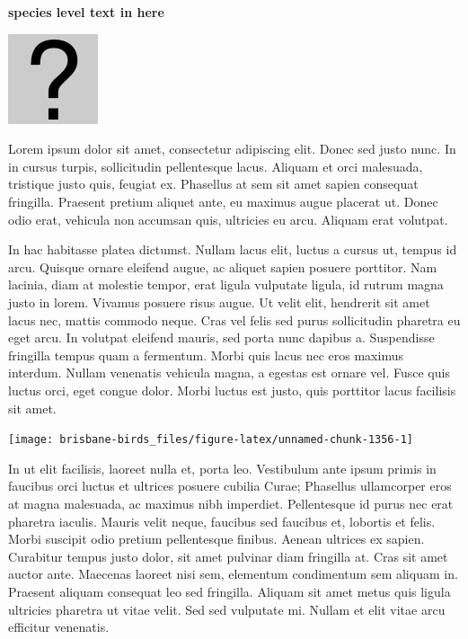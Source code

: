 \documentclass[]{book}
\let\origfigure\figure
\let\endorigfigure\endfigure
\renewenvironment{figure}[1][2] {
  \expandafter\origfigure\expandafter[H]
} {
  \endorigfigure
}
\begin{document}
\textbf{species level text in here}

\begin{figure}
\centering
\includegraphics{assets/missing.png}
\caption{No image for species}
\end{figure}

Lorem ipsum dolor sit amet, consectetur adipiscing elit. Donec sed justo
nunc. In in cursus turpis, sollicitudin pellentesque lacus. Aliquam et
orci malesuada, tristique justo quis, feugiat ex. Phasellus at sem sit
amet sapien consequat fringilla. Praesent pretium aliquet ante, eu
maximus augue placerat ut. Donec odio erat, vehicula non accumsan quis,
ultricies eu arcu. Aliquam erat volutpat.

In hac habitasse platea dictumst. Nullam lacus elit, luctus a cursus ut,
tempus id arcu. Quisque ornare eleifend augue, ac aliquet sapien posuere
porttitor. Nam lacinia, diam at molestie tempor, erat ligula vulputate
ligula, id rutrum magna justo in lorem. Vivamus posuere risus augue. Ut
velit elit, hendrerit sit amet lacus nec, mattis commodo neque. Cras vel
felis sed purus sollicitudin pharetra eu eget arcu. In volutpat eleifend
mauris, sed porta nunc dapibus a. Suspendisse fringilla tempus quam a
fermentum. Morbi quis lacus nec eros maximus interdum. Nullam venenatis
vehicula magna, a egestas est ornare vel. Fusce quis luctus orci, eget
congue dolor. Morbi luctus est justo, quis porttitor lacus facilisis sit
amet.

\begin{figure}
\texttt{[image: brisbane-birds\_files/figure-latex/unnamed-chunk-1356-1]} \caption{insert figure caption}\label{fig:unnamed-chunk-1356}
\end{figure}

In ut elit facilisis, laoreet nulla et, porta leo. Vestibulum ante ipsum
primis in faucibus orci luctus et ultrices posuere cubilia Curae;
Phasellus ullamcorper eros at magna malesuada, ac maximus nibh
imperdiet. Pellentesque id purus nec erat pharetra iaculis. Mauris velit
neque, faucibus sed faucibus et, lobortis et felis. Morbi suscipit odio
pretium pellentesque finibus. Aenean ultrices ex sapien. Curabitur
tempus justo dolor, sit amet pulvinar diam fringilla at. Cras sit amet
auctor ante. Maecenas laoreet nisi sem, elementum condimentum sem
aliquam in. Praesent aliquam consequat leo sed fringilla. Aliquam sit
amet metus quis ligula ultricies pharetra ut vitae velit. Sed sed
vulputate mi. Nullam et elit vitae arcu efficitur venenatis.
\end{document}
